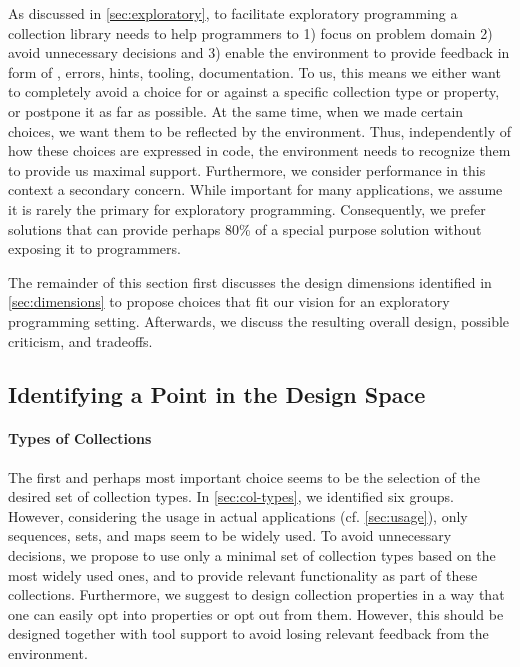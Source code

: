 \documentclass[sigconf, 10pt]{acmart}
\begin{document}

As discussed in \cref{sec:exploratory}, to facilitate exploratory programming
a collection library needs to help programmers to
1) focus on problem domain
2) avoid unnecessary decisions
and 3) enable the environment to provide feedback in form of
\eg, errors, hints, tooling, documentation.
To us, this means we either want to completely avoid a choice
for or against a specific collection type or property,
or postpone it as far as possible.
At the same time, when we made certain choices,
we want them to be reflected by the environment.
Thus, independently of how these choices are expressed in code,
the environment needs to recognize them to provide us maximal support.
Furthermore, we consider performance in this context a secondary concern.
While important for many applications,
we assume it is rarely the primary for exploratory programming.
Consequently, we prefer solutions that can provide perhaps 80\%
of a special purpose solution without exposing it to programmers. 

The remainder of this section first discusses the design dimensions
identified in \cref{sec:dimensions}
to propose choices that fit our vision for an exploratory programming setting.
Afterwards, we discuss the resulting overall design,
possible criticism, and tradeoffs. 

\subsection{Identifying a Point in the Design Space}

\paragraph{Types of Collections}
The first and perhaps most important choice seems to be the selection of the
desired set of collection types.
In \cref{sec:col-types}, we identified six groups.
However, considering the usage in actual applications (cf. \cref{sec:usage}),
only sequences, sets, and maps seem to be widely used.
To avoid unnecessary decisions,
we propose to use only a minimal set of collection types
based on the most widely used ones,
and to provide relevant functionality as part of these collections.
Furthermore, we suggest to design collection properties
in a way that one can easily opt into properties or opt out from them.
However, this should be designed together with tool support
to avoid losing relevant feedback from the environment.
\end{document}
